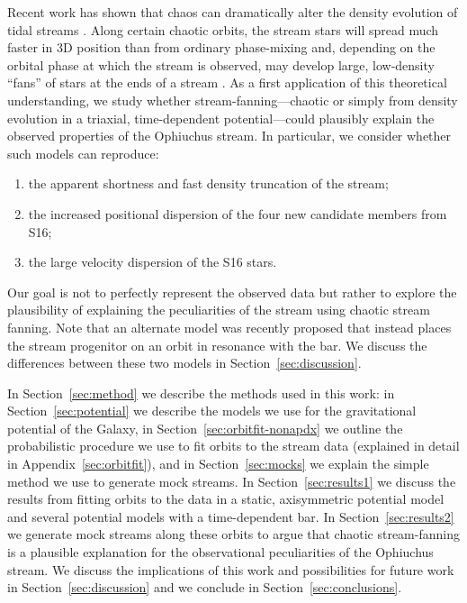 \documentclass[numberedappendix]{emulateapj}
\begin{document}
Recent work has shown that chaos can dramatically alter the density evolution of tidal streams \citep[e.g.,][]{fardal14, apw15-chaos}. Along certain chaotic orbits, the stream stars will spread much faster in 3D position than from ordinary phase-mixing and, depending on the orbital phase at which the stream is observed, may develop large, low-density ``fans'' of stars at the ends of a stream \citep{pearson15, apw15-chaos}. As a first application of this theoretical understanding, we study whether stream-fanning---chaotic or simply from density evolution in a triaxial, time-dependent potential---could plausibly explain the observed properties of the Ophiuchus stream. In particular, we consider whether such models can reproduce:
\begin{enumerate}
	\item the apparent shortness and fast density truncation of the stream;
	\item the increased positional dispersion of the four new candidate members from S16;
	\item the large velocity dispersion of the S16 stars.
\end{enumerate}
Our goal is not to perfectly represent the observed data but rather to explore the plausibility of explaining the peculiarities of the stream using chaotic stream fanning. Note that an alternate model was recently proposed that instead places the stream progenitor on an orbit in resonance with the bar. We discuss the differences between these two models in Section~\ref{sec:discussion}.

In Section~\ref{sec:method} we describe the methods used in this work: in Section~\ref{sec:potential} we describe the models we use for the gravitational potential of the Galaxy, in Section~\ref{sec:orbitfit-nonapdx} we outline the probabilistic procedure we use to fit orbits to the stream data (explained in detail in Appendix~\ref{sec:orbitfit}), and in Section~\ref{sec:mocks} we explain the simple method we use to generate mock streams. In Section~\ref{sec:results1} we discuss the results from fitting orbits to the data in a static, axisymmetric potential model and several potential models with a time-dependent bar. In Section~\ref{sec:results2} we generate mock streams along these orbits to argue that chaotic stream-fanning is a plausible explanation for the observational peculiarities of the Ophiuchus stream. We discuss the implications of this work and possibilities for future work in Section~\ref{sec:discussion} and we conclude in Section~\ref{sec:conclusions}.
\end{document}
